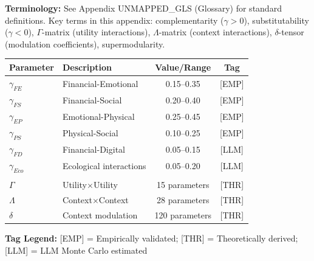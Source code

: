
\begin{tcolorbox}[colback=gray!5!white, colframe=gray!50!black]
\textbf{Terminology:} See Appendix UNMAPPED_GLS (Glossary) for standard definitions.
Key terms in this appendix: complementarity ($\gamma > 0$), substitutability ($\gamma < 0$),
$\Gamma$-matrix (utility interactions), $\Lambda$-matrix (context interactions),
$\delta$-tensor (modulation coefficients), supermodularity.
\end{tcolorbox}

\begin{tcolorbox}[colback=blue!5!white, colframe=blue!75!black,
    title=\textbf{Epistemic Status: Key Parameters}]

\renewcommand{\arraystretch}{1.3}
\begin{tabular}{@{}llcc@{}}
\toprule
\textbf{Parameter} & \textbf{Description} & \textbf{Value/Range} & \textbf{Tag} \\
\midrule
$\gamma_{FE}$ & Financial-Emotional & 0.15--0.35 & [EMP] \\
$\gamma_{FS}$ & Financial-Social & 0.20--0.40 & [EMP] \\
$\gamma_{EP}$ & Emotional-Physical & 0.25--0.45 & [EMP] \\
$\gamma_{PS}$ & Physical-Social & 0.10--0.25 & [EMP] \\
$\gamma_{FD}$ & Financial-Digital & 0.05--0.15 & [LLM] \\
$\gamma_{Eco}$ & Ecological interactions & 0.05--0.20 & [LLM] \\
\addlinespace
\multicolumn{4}{@{}l}{\textit{Matrix dimensions:}} \\
$\Gamma$ & Utility$\times$Utility & 15 parameters & [THR] \\
$\Lambda$ & Context$\times$Context & 28 parameters & [THR] \\
$\delta$ & Context modulation & 120 parameters & [THR] \\
\bottomrule
\end{tabular}

\vspace{0.5em}
\textbf{Tag Legend:} [EMP] = Empirically validated; [THR] = Theoretically derived;
[LLM] = LLM Monte Carlo estimated

\end{tcolorbox}

